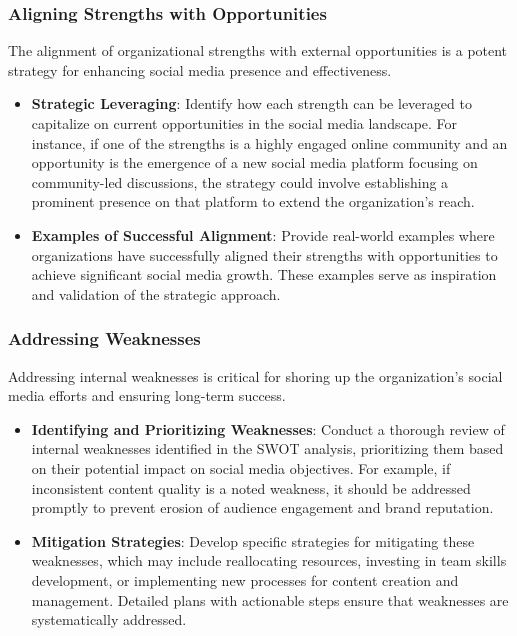 \documentclass[
]{book}
\providecommand{\tightlist}{%
  \setlength{\itemsep}{0pt}\setlength{\parskip}{0pt}}
\begin{document}
\hypertarget{aligning-strengths-with-opportunities}{%
\subsubsection{Aligning Strengths with Opportunities}\label{aligning-strengths-with-opportunities}}

The alignment of organizational strengths with external opportunities is a potent strategy for enhancing social media presence and effectiveness.

\begin{itemize}
\tightlist
\item
  \textbf{Strategic Leveraging}: Identify how each strength can be leveraged to capitalize on current opportunities in the social media landscape. For instance, if one of the strengths is a highly engaged online community and an opportunity is the emergence of a new social media platform focusing on community-led discussions, the strategy could involve establishing a prominent presence on that platform to extend the organization's reach.
\item
  \textbf{Examples of Successful Alignment}: Provide real-world examples where organizations have successfully aligned their strengths with opportunities to achieve significant social media growth. These examples serve as inspiration and validation of the strategic approach.
\end{itemize}

\hypertarget{addressing-weaknesses}{%
\subsubsection{Addressing Weaknesses}\label{addressing-weaknesses}}

Addressing internal weaknesses is critical for shoring up the organization's social media efforts and ensuring long-term success.

\begin{itemize}
\tightlist
\item
  \textbf{Identifying and Prioritizing Weaknesses}: Conduct a thorough review of internal weaknesses identified in the SWOT analysis, prioritizing them based on their potential impact on social media objectives. For example, if inconsistent content quality is a noted weakness, it should be addressed promptly to prevent erosion of audience engagement and brand reputation.
\item
  \textbf{Mitigation Strategies}: Develop specific strategies for mitigating these weaknesses, which may include reallocating resources, investing in team skills development, or implementing new processes for content creation and management. Detailed plans with actionable steps ensure that weaknesses are systematically addressed.
\end{itemize}
\end{document}

